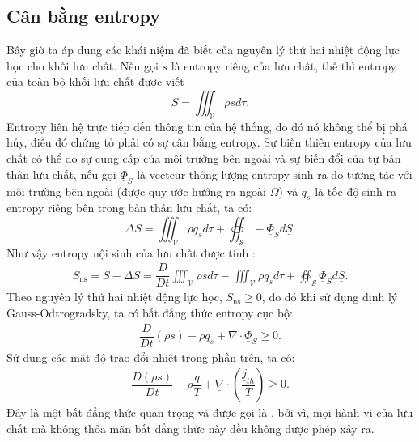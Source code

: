 \subsection{Cân bằng entropy}
    Bây giờ ta áp dụng các khái niệm đã biết của nguyên lý thứ hai nhiệt động lực học cho khối lưu chất. Nếu gọi $s$ là entropy riêng của lưu chất, thế thì entropy của toàn bộ khối lưu chất được viết 
        \[
            S=\iiint_\mathscr{V}\rho sd\tau.
        \]
    Entropy liên hệ trực tiếp đến thông tin của hệ thống, do đó nó không thể bị phá hủy, điều đó chứng tỏ phải có sự cân bằng entropy. Sự biến thiên entropy của lưu chất có thể do sự cung cấp của môi trường bên ngoài và sự biến đổi của tự bản thân lưu chất, nếu gọi $\underline{\Phi}_S$ là vecteur thông lượng entropy sinh ra do tương tác với môi trường bên ngoài (được quy ước hướng ra ngoài $\Omega$) và $q_s$ là tốc độ sinh ra entropy riêng bên trong bản thân lưu chất, ta có:
        \[
            \Delta S=\iiint_\mathscr{V}\rho q_sd\tau+\oiint_\mathscr{S}-\underline{\Phi}_Sd\underline{S}.
        \]
    Như vậy entropy nội sinh của lưu chất được tính :
        \begin{align}
            S_{\text{ns}}=\dot{S}-\Delta S=\dfrac{D}{Dt}\iiint_\mathscr{V} \rho sd\tau-\iiint_\mathscr{V}\rho q_sd\tau+\oiint_\mathscr{S}\underline{\Phi}_Sd\underline{S}.
        \end{align}
    Theo nguyên lý thứ hai nhiệt động lực học, $S_{\text{ns}}\ge0$, do đó khi sử dụng định lý Gauss-Odtrogradsky, ta có bất đẳng thức entropy cục bộ:
        \begin{align}
            \dfrac{D}{Dt}(\rho s)-\rho q_s+\underline{\nabla}\cdot\underline{\Phi}_S\ge 0.
        \end{align}
    Sử dụng các mật độ trao đổi nhiệt trong phần trên, ta có:
        \begin{align}
            \boxed{
                \dfrac{D(\rho s)}{Dt} - \rho\dfrac{q}{T} + \underline{\nabla}\cdot\left(\dfrac{\underline{j}_{th}}{T}\right)\ge 0
            }.
        \end{align}
    Đây là một bất đẳng thức quan trọng và được gọi là , bởi vì, mọi hành vi của lưu chất mà không thỏa mãn bất đẳng thức này đều không được phép xảy ra.
